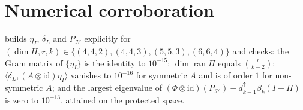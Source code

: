 \documentclass[11pt,reqno]{amsart}
\theoremstyle{plain}
\theoremstyle{remark}
\newcommand{\id}{\mathrm{id}}
\newcommand{\ip}[2]{\langle #1,#2\rangle}
\begin{document}
\section*{Numerical corroboration}

 builds $\eta_I$, $\delta_L$ and
$P_{\mathcal H}$ explicitly for
$(\dim H,r,k)\in\{(4,4,2),(4,4,3),(5,5,3),(6,6,4)\}$ and checks: the Gram matrix
of $\{\eta_I\}$ is the identity to $10^{-15}$; $\dim\operatorname{ran}\Pi$ equals
$\binom r{k-2}$; $\ip{\delta_L}{(A\otimes\id)\eta_I}$ vanishes to $10^{-16}$ for
symmetric $A$ and is of order $1$ for non-symmetric $A$; and the largest
eigenvalue of
$(\Phi\otimes\id)(P_{\mathcal H})-d^\uparrow_{k-1}\beta_k(I-\Pi)$ is zero to
$10^{-13}$, attained on the protected space.
\end{document}
